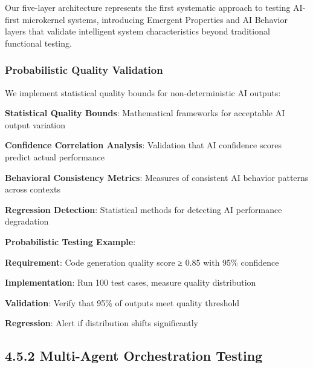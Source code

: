 \begin{infobox}[title=Novel Testing Contribution]
Our five-layer architecture represents the first systematic approach to testing AI-first microkernel systems, introducing Emergent Properties and AI Behavior layers that validate intelligent system characteristics beyond traditional functional testing.
\end{infobox}

\subsubsection*{Probabilistic Quality Validation}

We implement statistical quality bounds for non-deterministic AI outputs:

\begin{compactlist}
    \item \textbf{Statistical Quality Bounds}: Mathematical frameworks for acceptable AI output variation
    \item \textbf{Confidence Correlation Analysis}: Validation that AI confidence scores predict actual performance
    \item \textbf{Behavioral Consistency Metrics}: Measures of consistent AI behavior patterns across contexts
    \item \textbf{Regression Detection}: Statistical methods for detecting AI performance degradation
\end{compactlist}

\begin{alertbox}
\textbf{Probabilistic Testing Example}:
\begin{compactlist}
    \item \textbf{Requirement}: Code generation quality score ≥ 0.85 with 95\% confidence
    \item \textbf{Implementation}: Run 100 test cases, measure quality distribution
    \item \textbf{Validation}: Verify that 95\% of outputs meet quality threshold
    \item \textbf{Regression}: Alert if distribution shifts significantly
\end{compactlist}
\end{alertbox}

\subsection*{4.5.2 Multi-Agent Orchestration Testing}
\label{subsec:multi-agent-testing}

